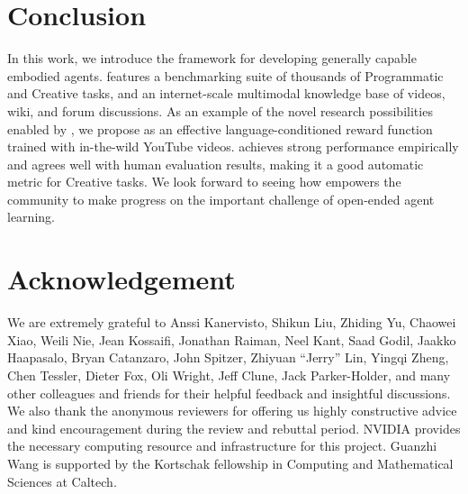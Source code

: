\section{Conclusion}
\label{sec:conclusion}

In this work, we introduce the \minedojo framework for developing generally capable embodied agents. \minedojo features a benchmarking suite of thousands of Programmatic and Creative tasks, and an internet-scale multimodal knowledge base of videos, wiki, and forum discussions. As an example of the novel research possibilities enabled by \minedojo, we propose \mineclip as an effective language-conditioned reward function trained with in-the-wild YouTube videos. \mineclip achieves strong performance empirically and agrees well with human evaluation results, making it a good automatic metric for Creative tasks. We look forward to seeing how \minedojo empowers the community to make progress on the important challenge of open-ended agent learning.


\section{Acknowledgement}
\label{sec:acknowledgement}

We are extremely grateful to Anssi Kanervisto, Shikun Liu, Zhiding Yu, Chaowei Xiao, Weili Nie, Jean Kossaifi, Jonathan Raiman, Neel Kant, Saad Godil,  Jaakko Haapasalo, Bryan Catanzaro, John Spitzer, Zhiyuan ``Jerry'' Lin, Yingqi Zheng, Chen Tessler, Dieter Fox, Oli Wright, Jeff Clune, Jack Parker-Holder, and many other colleagues and friends for their helpful feedback and insightful discussions. We also thank the anonymous reviewers for offering us highly constructive advice and kind encouragement during the review and rebuttal period. NVIDIA provides the necessary computing resource and infrastructure for this project. Guanzhi Wang is supported by the Kortschak fellowship in Computing and Mathematical Sciences at Caltech. 